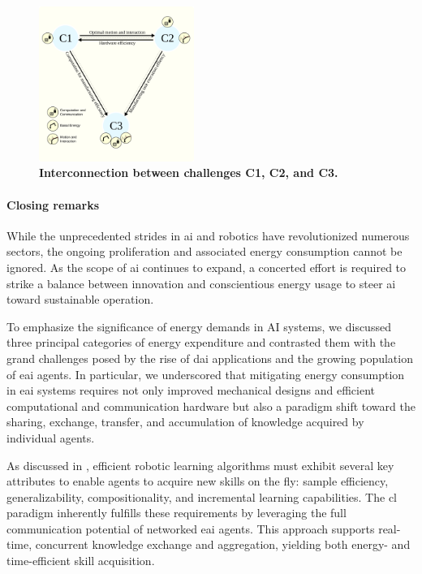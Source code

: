\documentclass[12pt]{article}
\begin{document}
\begin{figure}[!t]
	\centering
	\includegraphics[width=0.45\textwidth]{fig/grand_challenges_connections.png}
	\caption{\textbf{Interconnection between challenges C1, C2, and C3.}}
	\label{fig:challengesConnected}
\end{figure}

\paragraph*{Closing remarks}
While the unprecedented strides in \ac{ai} and robotics have revolutionized numerous sectors, the ongoing proliferation and associated energy consumption cannot be ignored. As the scope of \ac{ai} continues to expand, a concerted effort is required to strike a balance between innovation and conscientious energy usage to steer \ac{ai} toward sustainable operation.

To emphasize the significance of energy demands in AI systems, we discussed three principal categories of energy expenditure and contrasted them with the grand challenges posed by the rise of \acl{dai} applications and the growing population of \ac{eai} agents. In particular, we underscored that mitigating energy consumption in \ac{eai} systems requires not only improved mechanical designs and efficient computational and communication hardware but also a paradigm shift toward the sharing, exchange, transfer, and accumulation of knowledge acquired by individual agents.

As discussed in \cite{Kaelbling2020foundationefficientrobot}, efficient robotic learning algorithms must exhibit several key attributes to enable agents to acquire new skills on the fly: sample efficiency, generalizability, compositionality, and incremental learning capabilities. The \acl{cl} paradigm inherently fulfills these requirements by leveraging the full communication potential of networked \ac{eai} agents. This approach supports real-time, concurrent knowledge exchange and aggregation, yielding both energy- and time-efficient skill acquisition.
\end{document}
